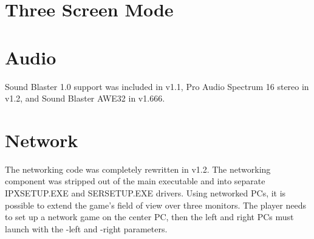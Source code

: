 \section{Three Screen Mode}

\section{Audio}
Sound Blaster 1.0 support was included in v1.1, Pro Audio Spectrum 16 stereo in v1.2, and Sound Blaster AWE32 in v1.666.

\section{Network}
The networking code was completely rewritten in v1.2. The networking component was stripped out of the main executable and into separate IPXSETUP.EXE and SERSETUP.EXE drivers. Using networked PCs, it is possible to extend the game's field of view over three monitors. The player needs to set up a network game on the center PC, then the left and right PCs must launch with the -left and -right parameters. 